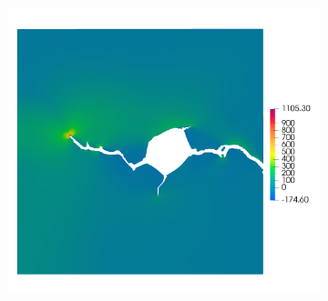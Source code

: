 \begin{frame}
\begin{columns}[T]
\begin{column}{0.4\textwidth}
\begin{figure}
\begin{subfigure}[t]{0.47\linewidth}
        \end{subfigure}
        \begin{subfigure}[t]{0.47\linewidth}
          \centering
          \includegraphics[width=0.9\linewidth,scale=0.3]{Chapter345/figures/partial_hbs_1_stress}
        \end{subfigure}
        

\end{figure}
\end{column}
\end{columns}
\end{frame}
